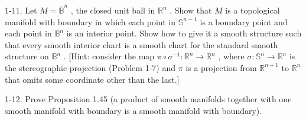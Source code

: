 \begin{exercise}
\label{prob:1-11}
\leanok
{}
1-11. Let $M = {\overline{\mathbb{B}}}^{n}$ , the closed unit ball in ${\mathbb{R}}^{n}$ . Show that $M$ is a topological manifold with boundary in which each point in ${\mathbb{S}}^{n - 1}$ is a boundary point and each point in ${\mathbb{B}}^{n}$ is an interior point. Show how to give it a smooth structure such that every smooth interior chart is a smooth chart for the standard smooth structure on ${\mathbb{B}}^{n}$ . [Hint: consider the map $\pi  \circ  {\sigma }^{-1} : {\mathbb{R}}^{n} \rightarrow  {\mathbb{R}}^{n}$ , where $\sigma  : {\mathbb{S}}^{n} \rightarrow  {\mathbb{R}}^{n}$ is the stereographic projection (Problem 1-7) and $\pi$ is a projection from ${\mathbb{R}}^{n + 1}$ to ${\mathbb{R}}^{n}$ that omits some coordinate other than the last.]
\end{exercise}

\begin{exercise}
\label{prob:1-12}
\leanok
{}
1-12. Prove Proposition 1.45 (a product of smooth manifolds together with one smooth manifold with boundary is a smooth manifold with boundary).
\end{exercise}


